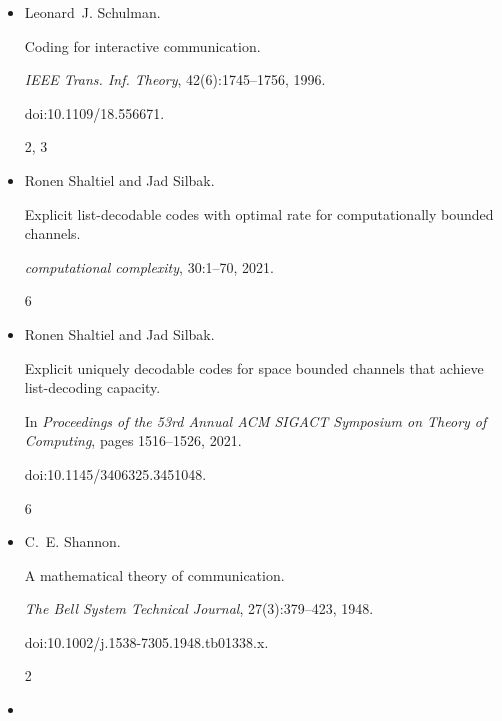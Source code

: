 \begin{itemize}
Irving S Reed.


A class of multiple-error-correcting codes and the decoding scheme.


\emph{IEEE Transactions on Information Theory}, 4(4):38–49, 1954.


doi:10.1109/TIT.1954.1057465.


6




\item[] 
[26]

Leonard J. Schulman.


Coding for interactive communication.


\emph{IEEE Trans. Inf. Theory}, 42(6):1745–1756, 1996.


doi:10.1109/18.556671.


2, 3




\item[] 
[27]

Ronen Shaltiel and Jad Silbak.


Explicit list-decodable codes with optimal rate for computationally
bounded channels.


\emph{computational complexity}, 30:1–70, 2021.


6




\item[] 
[28]

Ronen Shaltiel and Jad Silbak.


Explicit uniquely decodable codes for space bounded channels that
achieve list-decoding capacity.


In \emph{Proceedings of the 53rd Annual ACM SIGACT Symposium on Theory
of Computing}, pages 1516–1526, 2021.


doi:10.1145/3406325.3451048.


6




\item[] 
[29]

C. E. Shannon.


A mathematical theory of communication.


\emph{The Bell System Technical Journal}, 27(3):379–423, 1948.


doi:10.1002/j.1538-7305.1948.tb01338.x.


2




\item[] 
[30]


\end{itemize}
